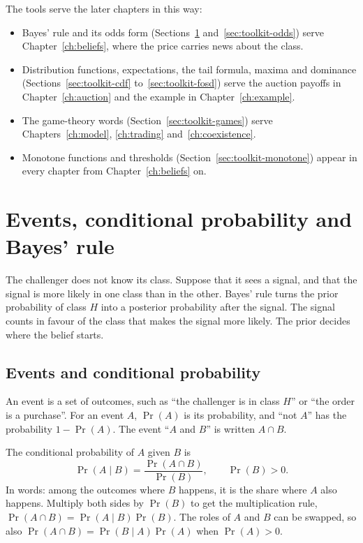 The tools serve the later chapters in this way:
\begin{itemize}
\item Bayes' rule and its odds form (Sections~\ref{sec:toolkit-bayes} and~\ref{sec:toolkit-odds}) serve
Chapter~\ref{ch:beliefs}, where the price carries news about the class.
\item Distribution functions, expectations, the tail formula, maxima and dominance
(Sections~\ref{sec:toolkit-cdf} to~\ref{sec:toolkit-fosd}) serve the auction payoffs in Chapter~\ref{ch:auction}
and the example in Chapter~\ref{ch:example}.
\item The game-theory words (Section~\ref{sec:toolkit-games}) serve Chapters~\ref{ch:model}, \ref{ch:trading}
and~\ref{ch:coexistence}.
\item Monotone functions and thresholds (Section~\ref{sec:toolkit-monotone}) appear in every chapter from
Chapter~\ref{ch:beliefs} on.
\end{itemize}

\section{Events, conditional probability and Bayes' rule}\label{sec:toolkit-bayes}

\begin{intuition}
The challenger does not know its class. Suppose that it sees a signal, and that the signal is more likely in one
class than in the other. Bayes' rule turns the prior probability of class \(H\) into a posterior probability after
the signal. The signal counts in favour of the class that makes the signal more likely. The prior decides where
the belief starts.
\end{intuition}

\subsection{Events and conditional probability}

An event is a set of outcomes, such as ``the challenger is in class \(H\)'' or ``the order is a purchase''. For an
event \(A\), \(\Pr(A)\) is its probability, and ``not \(A\)'' has the probability \(1-\Pr(A)\). The event ``\(A\)
and \(B\)'' is written \(A\cap B\).

The conditional probability of \(A\) given \(B\) is
\begin{equation}\label{eq:toolkit-cond}
\Pr(A\mid B)=\frac{\Pr(A\cap B)}{\Pr(B)},\qquad \Pr(B)>0.
\end{equation}
In words: among the outcomes where \(B\) happens, it is the share where \(A\) also happens. Multiply both sides by
\(\Pr(B)\) to get the multiplication rule, \(\Pr(A\cap B)=\Pr(A\mid B)\Pr(B)\). The roles of \(A\) and \(B\) can
be swapped, so also \(\Pr(A\cap B)=\Pr(B\mid A)\Pr(A)\) when \(\Pr(A)>0\).

